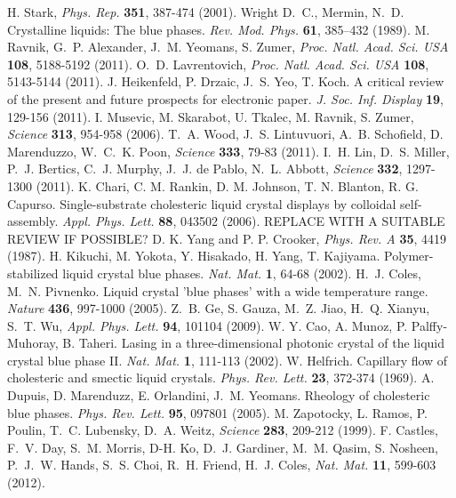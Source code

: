 \documentclass[12pt]{article}
\begin{document}
\begin{thebibliography}{99}
 H. Stark, {\it Phys. Rep.} {\bf 351}, 387-474 (2001).
 Wright D.~C., Mermin, N.~D. Crystalline liquids: The blue phases. {\it Rev. Mod. Phys.} {\bf 61}, 385–432 (1989).
 M. Ravnik, G.~P. Alexander, J.~M. Yeomans,  
S. Zumer, {\it Proc. Natl. Acad. Sci. USA} {\bf 108}, 5188-5192 (2011).
 O.~D. Lavrentovich, {\it Proc. Natl. Acad. Sci.
USA} {\bf 108}, 5143-5144 (2011).
 J. Heikenfeld, P. Drzaic,  J.~S. Yeo, T. Koch.
A critical review of the present and future prospects for electronic paper.
{\it J. Soc. Inf. Display} {\bf 19}, 129-156 (2011).
 I. Musevic, M. Skarabot, U. Tkalec, M. Ravnik,
S. Zumer, {\it Science} {\bf 313}, 954-958 (2006).
 T.~A. Wood, J.~S. Lintuvuori, A.~B. Schofield, D. Marenduzzo,
W.~C.~K. Poon, {\it Science} {\bf 333}, 79-83 (2011).
 I.~H. Lin, D.~S. Miller, P.~J. Bertics, C.~J. Murphy, J.~J. de Pablo, N.~L. Abbott, {\it Science} {\bf 332}, 1297-1300 (2011).
 K. Chari, C. M. Rankin, D. M. Johnson, T. N. Blanton,
R. G. Capurso. Single-substrate cholesteric liquid crystal displays by colloidal self-assembly. {\it Appl. Phys. Lett.} {\bf 88}, 043502 (2006). REPLACE WITH A SUITABLE REVIEW IF POSSIBLE?
 D. K. Yang and P. P. Crooker, {\it Phys. Rev. A}
{\bf 35}, 4419 (1987).
 H. Kikuchi, M. Yokota, Y. Hisakado, H. Yang, T. Kajiyama.
Polymer-stabilized liquid crystal blue phases.
{\it Nat. Mat.} {\bf 1}, 64-68 (2002).
 H.~J. Coles, M.~N. Pivnenko.
Liquid crystal 'blue phases' with a wide temperature range.
{\it Nature} {\bf 436}, 997-1000 (2005).
 Z.~B. Ge, S. Gauza, M.~Z. Jiao, H.~Q. Xianyu, S.~T. Wu,
{\it Appl. Phys. Lett.} {\bf 94}, 101104 (2009).
 W. Y. Cao, A. Munoz, P. Palffy-Muhoray, B. Taheri.
Lasing in a three-dimensional photonic crystal of the liquid crystal blue 
phase II. {\it Nat. Mat.} {\bf 1}, 111-113 (2002).
 	W. Helfrich. Capillary flow of cholesteric
and smectic liquid crystals. {\it Phys. Rev. Lett.} {\bf 23}, 372-374 (1969).
 A. Dupuis, D. Marenduzz, E. Orlandini, J.~M. Yeomans.
Rheology of cholesteric blue phases. {\it Phys. Rev. Lett.} {\bf 95},
097801 (2005).
 M. Zapotocky, L. Ramos, P. Poulin, T.~C. Lubensky, 
D.~A. Weitz, {\it Science} {\bf 283}, 209-212 (1999).
 F. Castles, F.~V. Day, S.~M. Morris, D-H. Ko, D.~J. Gardiner, M.~M. Qasim, S. Nosheen, P.~J.~W. Hands, S.~S. Choi, R.~H. Friend, H.~J. Coles, {\it Nat. Mat.} {\bf 11}, 599-603 (2012).

\end{thebibliography}
\end{document}
